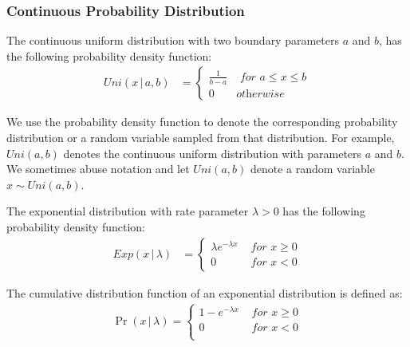 \subsubsection{Continuous Probability Distribution}
\label{subsubsec:ContinuousProbabilityDistribution}

\begin{definition}
    \label{def:UniformDistribution}
    The continuous uniform distribution with two boundary parameters $a$ and $b$, has the following probability density function:
    \begin{equation}
        \begin{split}
            Uni\left(x \,|\,a,b\right)
            &=
            \begin{cases}
                \frac{1}{b-a} & \textit{ for } a\leq x\leq b \\
                0             & \textit{otherwise}
            \end{cases}
        \end{split}
    \end{equation}
\end{definition}

We use the probability density function to denote the corresponding probability distribution or a random variable sampled from that distribution. For example, $Uni\left(a,b\right)$ denotes the continuous uniform distribution with parameters $a$ and $b$. We sometimes abuse notation and let $Uni\left( a,b\right)$ denote a random variable $x \sim Uni\left( a,b\right)$.


\begin{definition}
    \label{def:ExponentialDistribution}
    The exponential distribution with rate parameter $\lambda>0$ has the following probability density function:
    \begin{equation}
        \begin{split}
            Exp\left(x \,|\,\lambda\right)            &=
            \begin{cases}
                \lambda e^{-\lambda x } & \textit{ for }  x\geq 0 \\
                0                       & \textit{ for }  x <0
            \end{cases}
        \end{split}
    \end{equation}
\end{definition}
The cumulative distribution function of an exponential distribution is defined as:
\begin{equation}
    \begin{split}
        \Pr\left( x\,|\,\lambda\right)=
        \begin{cases}
            1- e^{-\lambda x} & \textit{ for } x \geq 0 \\
            0                 & \textit{ for } x < 0    \\
        \end{cases}
    \end{split}
\end{equation}



